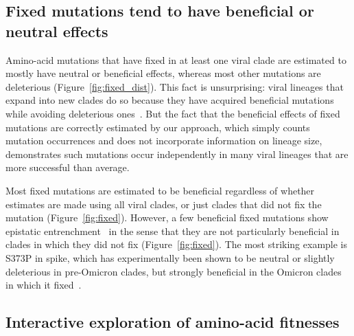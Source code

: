 \documentclass[9pt,twocolumn,twoside]{gsajnl_modified}
\providecommand{\DIFaddend}{} %
\begin{document}
\DIFaddend \subsection*{Fixed mutations tend to have beneficial or neutral effects}
Amino-acid mutations that have fixed in at least one viral clade are estimated to mostly have neutral or beneficial effects, whereas most other mutations are deleterious (Figure~\ref{fig:fixed_dist}).
This fact is unsurprising: viral lineages that expand into new clades do so because they have acquired beneficial mutations while avoiding deleterious ones~\citep{luksza2014predictive, koelle2015effects, huddleston2020integrating}.
But the fact that the beneficial effects of fixed mutations are correctly estimated by our approach, which simply counts mutation occurrences and does not incorporate information on lineage size, demonstrates such mutations occur independently in many viral lineages that are more successful than average.

Most fixed mutations are estimated to be beneficial regardless of whether estimates are made using all viral clades, or just clades that did not fix the mutation (Figure~\ref{fig:fixed}).
However, a few beneficial fixed mutations show epistatic entrenchment~\citep{shah2015contingency, starr2018pervasive} in the sense that they are not particularly beneficial in clades in which they did not fix (Figure~\ref{fig:fixed}).
The most striking example is S373P in spike, which has experimentally been shown to be neutral or slightly deleterious in pre-Omicron clades, but strongly beneficial in the Omicron clades in which it fixed~\citep{starr2022deep, moulana2022compensatory}.

\subsection*{Interactive exploration of amino-acid fitnesses}
\end{document}
